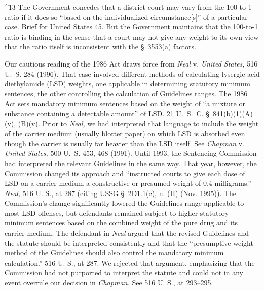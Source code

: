 {{^13 The Government concedes that a district court may vary from
the 100-to-1 ratio if it does so ``based on the individualized
circumstance[s]'' of a particular case. Brief for United States 45. But
the Government maintains that the 100-to-1 ratio is binding in the sense
that a court may not give any weight to its own view that the ratio
itself is inconsistent with the \S~3553(a) factors.

  Our cautious reading of the 1986 Act draws force from \emph{Neal}
v. \emph{United States,} 516 U.~S. 284 (1996). That case involved
different methods of calculating lysergic acid diethylamide (LSD)
weights, one applicable in determining statutory minimum sentences, the
other controlling the calculation of Guidelines ranges. The 1986 Act
sets mandatory minimum sentences based on the weight of ``a mixture
or substance containing a detectable amount'' of LSD. 21 U.~S.~C.
\S~841(b)(1)(A)(v), (B)(v). Prior to \emph{Neal,} we had interpreted
that language to include the weight of the carrier medium (usually
blotter paper) on which LSD is absorbed even though the carrier is
usually far heavier than the LSD itself. See \emph{Chapman} v. \emph{United
States,} 500 U.~S. 453, 468 (1991). Until 1993, the Sentencing
Commission had interpreted the relevant Guidelines in the same way. That
year, however, the Commission changed its approach and ``instructed
courts to give each dose of LSD on a carrier medium a constructive or
presumed weight of 0.4 milligrams.'' \emph{Neal,} 516 U. S., \newpage  at
287 (citing USSG \S~2D1.1(c), n. (H) (Nov. 1995)). The Commission's
change significantly lowered the Guidelines range applicable to most
LSD offenses, but defendants remained subject to higher statutory
minimum sentences based on the combined weight of the pure drug and
its carrier medium. The defendant in \emph{Neal} argued that the revised
Guidelines and the statute should be interpreted consistently and that
the ``presumptive-weight method of the Guidelines should also control
the mandatory minimum calculation.'' 516 U. S., at 287. We rejected
that argument, emphasizing that the Commission had not purported to
interpret the statute and could not in any event overrule our decision
in \emph{Chapman.} See 516 U. S., at 293--295.

}}
